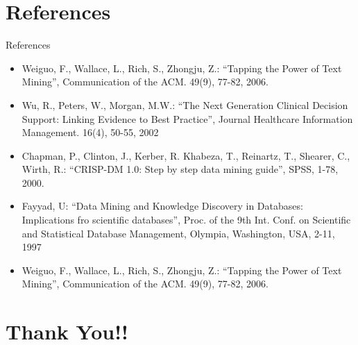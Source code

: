 \documentclass{SKP-beamer}
\begin{document}
\section{\textbf{References}}

\begin{frame}{References}
	\begin{itemize}
	\item Weiguo, F., Wallace, L., Rich, S., Zhongju, Z.: 
	“Tapping the Power of Text Mining”, Communication of the 
	ACM. 49(9), 77-82, 2006. 
	\item Wu, R., Peters, W., Morgan, M.W.: “The Next 
	Generation Clinical Decision Support: Linking Evidence to 
	Best Practice”, Journal Healthcare Information Management. 
	16(4), 50-55, 2002
	\item Chapman, P., Clinton, J., Kerber, R. Khabeza, T., 
	Reinartz, T., Shearer, C., Wirth, R.: “CRISP-DM 1.0: Step 
	by step data mining guide”, SPSS, 1-78, 2000.
	\item  Fayyad, U: “Data Mining and Knowledge Discovery in 
	Databases: Implications fro scientific databases”, Proc. of the 
	9th Int. Conf. on Scientific and Statistical Database 
	Management, Olympia, Washington, USA, 2-11, 1997
	\item Weiguo, F., Wallace, L., Rich, S., Zhongju, Z.: 
	“Tapping the Power of Text Mining”, Communication of the 
	ACM. 49(9), 77-82, 2006.
    \end{itemize}	 
\end{frame}



\section{\textbf{Thank You!!}}
\end{document}
